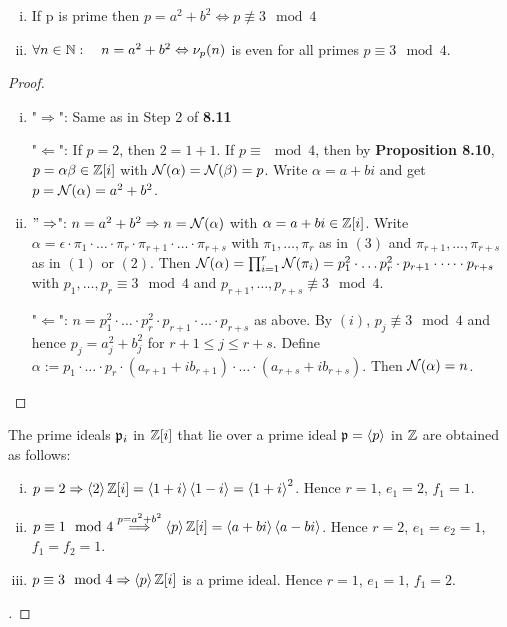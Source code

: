 \begin{Kor}[Fermat]
	\begin{enumerate}[(i)]
		\item If p is prime then $p = a^2 + b^2 \Leftrightarrow p \not\equiv 3 \mod 4$
		
		\item $\forall n \in \mathbb{N}: \quad n = a^2+b^2 \Leftrightarrow \nu_p(n) $ is even for all primes $p \equiv 3 \mod 4$.
	\end{enumerate}
\end{Kor}
\begin{proof}
	\begin{enumerate}[(i)]
		\item "$\Rightarrow$": Same as in Step 2 of \textbf{8.11}
		
		"$\Leftarrow$": If $p = 2$, then $2 = 1+1$. If $p \equiv \mod 4$, then by \textbf{Proposition 8.10}, $p = \alpha\beta \in \mathbb{Z}[i]$ with $\operatorname{\mathcal{N}}(\alpha) = \operatorname{\mathcal{N}}(\beta) = p$. Write $\alpha = a +bi$ and get $p = \operatorname{\mathcal{N}}(\alpha) = a^2 + b^2$.
		
		\item $"\Rightarrow$": $n = a^2+b^2 \Rightarrow n = \operatorname{\mathcal{N}}(\alpha)$ with $\alpha = a+bi \in \mathbb{Z}[i]$. Write $\alpha = \epsilon \cdot \pi_1 \cdot \dots \cdot \pi_r \cdot \pi_{r+1}\cdot \dots \cdot \pi_{r+s}$ with $\pi_1, \dots, \pi_r$ as in $(3)$ and $\pi_{r+1}, \dots, \pi_{r+s}$ as in $(1)$ or $(2)$. Then $\operatorname{\mathcal{N}}(\alpha) = \prod_{i=1}^r \operatorname{\mathcal{N}}(\pi_i) = p_1^2 \cdot \dots p_r^2 \cdot p_{r+1} \cdot \dots \cdot p_{r+s}$ with $p_1, \dots, p_r \equiv 3 \mod 4$ and $p_{r+1}, \dots, p_{r+s} \not\equiv 3 \mod 4$.
		
		"$\Leftarrow$": $n = p_1^2 \cdot \dots \cdot p_r^2 \cdot p_{r+1} \cdot \dots \cdot p_{r+s}$ as above. By $(i)$, $p_j \not\equiv 3 \mod 4$ and hence $p_j = a_j^2+b_j^2$ for $r+1 \leq j \leq r+s$. Define $\alpha := p_1 \cdot \dots \cdot p_r \cdot (a_{r+1}+ib_{r+1})  \cdot \dots \cdot (a_{r+s} + ib_{r+s})$. Then $\operatorname{\mathcal{N}}(\alpha) = n$.
	\end{enumerate}
\end{proof}

\begin{Kor}
	The prime ideals $\mathfrak{p}_i$ in $\mathbb{Z}[i]$ that lie over a prime ideal $\mathfrak{p} = \left\langle {p} \right\rangle$ in $\mathbb{Z}$ are obtained as follows:
	\begin{enumerate}[(i)]
		\item $p = 2 \Rightarrow \left\langle {2} \right\rangle\mathbb{Z}[i] = \left\langle {1+i} \right\rangle\left\langle {1-i} \right\rangle = \left\langle {1+i} \right\rangle^2$. Hence $r = 1$, $e_1 = 2$, $f_1 = 1$.
		
		\item $p \equiv 1 \mod 4 \overset{p = a^2+b^2}{\Longrightarrow} \left\langle {p} \right\rangle\mathbb{Z}[i] = \left\langle {a+bi} \right\rangle\left\langle {a-bi} \right\rangle$. Hence $r = 2$, $e_1 = e_2 =  1$, $f_1 = f_2 = 1$.
		
		\item $p \equiv 3 \mod 4 \Rightarrow \left\langle {p} \right\rangle\mathbb{Z}[i]$ is a prime ideal. Hence $r = 1$, $e_1 = 1$, $f_1 = 2$.
	\end{enumerate}
\end{Kor}
\begin{proof}[]
\end{proof}

